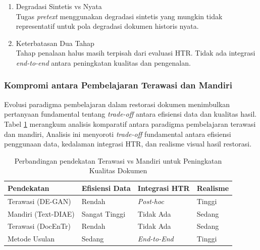 \documentclass[12pt,a4paper]{article}
\begin{document}
\begin{enumerate}[leftmargin=*, labelindent=0pt, itemsep=1ex, topsep=0pt]
\begin{enumerate}[leftmargin=1.5em, labelsep=0.5em, itemindent=0pt, label=\alph*., topsep=0pt, parsep=0pt, itemsep=0pt]
      \item Degradasi Sintetis vs Nyata \mbox{}\\[0.1em]
            Tugas \textit{pretext} menggunakan degradasi sintetis yang mungkin tidak representatif untuk pola degradasi dokumen historis nyata.

      \item Keterbatasan Dua Tahap \mbox{}\\[0.1em]
            Tahap penalaan halus masih terpisah dari evaluasi HTR. Tidak ada integrasi \textit{end-to-end} antara peningkatan kualitas dan pengenalan.
\end{enumerate}

\end{enumerate}

\subsubsection{Kompromi antara Pembelajaran Terawasi dan Mandiri}

Evolusi paradigma pembelajaran dalam restorasi dokumen menimbulkan pertanyaan fundamental tentang \textit{trade-off} antara efisiensi data dan kualitas hasil. Tabel \ref{tab:supervised-selfsupervised} merangkum analisis komparatif antara paradigma pembelajaran terawasi dan mandiri, Analisis ini menyoroti \textit{trade-off} fundamental antara efisiensi penggunaan data, kedalaman integrasi HTR, dan realisme visual hasil restorasi.

\begin{table}[htbp]
      \centering
      \caption[Perbandingan Pendekatan Terawasi vs Mandiri]{Perbandingan pendekatan Terawasi vs Mandiri untuk Peningkatan Kualitas Dokumen}
      \label{tab:supervised-selfsupervised}
      \small
      \begin{tabularx}{\textwidth}{|>{\raggedright\arraybackslash}X|>{\centering\arraybackslash}p{2cm}|>{\centering\arraybackslash}p{2cm}|>{\centering\arraybackslash}p{1.8cm}|}
            \hline
            \textbf{Pendekatan} & \textbf{Efisiensi Data} & \textbf{Integrasi HTR} & \textbf{Realisme} \\ \hline
            Terawasi (DE-GAN)         & Rendah                  & \textit{Post-hoc}               & Tinggi           \\ \hline
            Mandiri (Text-DIAE) & Sangat Tinggi           & Tidak Ada              & Sedang           \\ \hline
            Terawasi (DocEnTr)        & Rendah                  & Tidak Ada              & Sedang           \\ \hline
            Metode Usulan              & Sedang                  & \textit{End-to-End}         & Tinggi           \\ \hline
      \end{tabularx}
\end{table}
\end{document}
